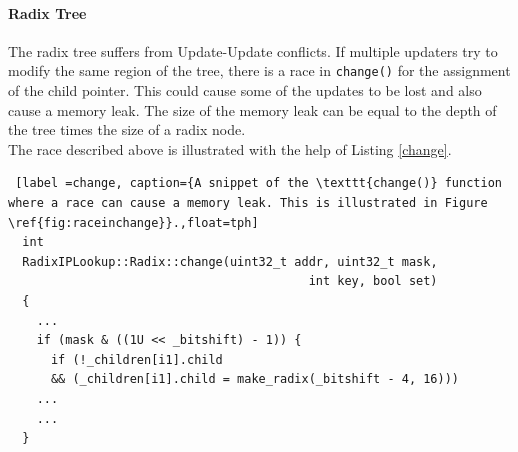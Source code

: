 \documentclass[a4paper]{article}
\begin{document}
\paragraph{Radix Tree}
The radix tree suffers from Update-Update conflicts. If multiple updaters try to modify the same region of the tree, there is a race in \verb+change()+ for the assignment of the child pointer. This could cause some of the updates to be lost and also cause a memory leak. The size of the memory leak can be equal to the depth of the tree times the size of a radix node.\\

The race described above is illustrated with the help of Listing \ref{change}.
\begin{lstlisting} [label =change, caption={A snippet of the \texttt{change()} function where a race can cause a memory leak. This is illustrated in Figure \ref{fig:raceinchange}}.,float=tph]
  int
  RadixIPLookup::Radix::change(uint32_t addr, uint32_t mask,
                                          int key, bool set)
  {
    ...
    if (mask & ((1U << _bitshift) - 1)) {
      if (!_children[i1].child
      && (_children[i1].child = make_radix(_bitshift - 4, 16)))
    ...
    ...
  }
\end{lstlisting}
\end{document}
